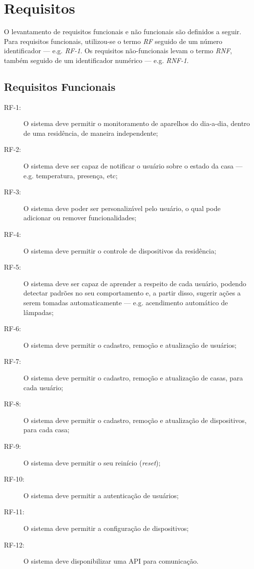 \section{Requisitos \label{sec:requisitos}}

O levantamento de requisitos funcionais e não funcionais são definidos a seguir. Para requisitos funcionais, utilizou-se o termo \emph{RF} seguido de um número identificador --- e.g. \emph{RF-1}. Os requisitos não-funcionais levam o termo \emph{RNF}, também seguido de um identificador numérico --- e.g. \emph{RNF-1}.

\subsection{Requisitos Funcionais}
\begin{description}
\item[RF-1:]O sistema deve permitir o monitoramento de aparelhos do dia-a-dia, dentro de uma residência, de maneira independente;
\item[RF-2:]O sistema deve ser capaz de notificar o usuário sobre o estado da casa --- e.g. temperatura, presença, etc;
\item[RF-3:]O sistema deve poder ser personalizável pelo usuário, o qual pode adicionar ou remover funcionalidades;
\item[RF-4:]O sistema deve permitir o controle de dispositivos da residência;
\item[RF-5:]O sistema deve ser capaz de aprender a respeito de cada usuário, podendo detectar padrões no seu comportamento e, a partir disso, sugerir ações a serem tomadas automaticamente --- e.g. acendimento automático de lâmpadas;
\item[RF-6:]O sistema deve permitir o cadastro, remoção e atualização de usuários;
\item[RF-7:]O sistema deve permitir o cadastro, remoção e atualização de casas, para cada usuário;
\item[RF-8:]O sistema deve permitir o cadastro, remoção e atualização de dispositivos, para cada casa;
\item[RF-9:]O sistema deve permitir o seu reinício (\emph{reset});
\item[RF-10:]O sistema deve permitir a autenticação de usuários;
\item[RF-11:]O sistema deve permitir a configuração de dispositivos;
\item[RF-12:]O sistema deve disponibilizar uma API para comunicação.

\end{description}

